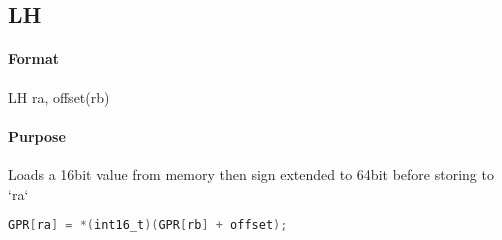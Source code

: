 \subsection{LH}


\paragraph{Format} LH ra, offset(rb)

\paragraph{Purpose} Loads a 16bit value from memory then sign extended to 64bit before storing to `ra`

\begin{lstlisting}[language=C]
    GPR[ra] = *(int16_t)(GPR[rb] + offset);
\end{lstlisting}